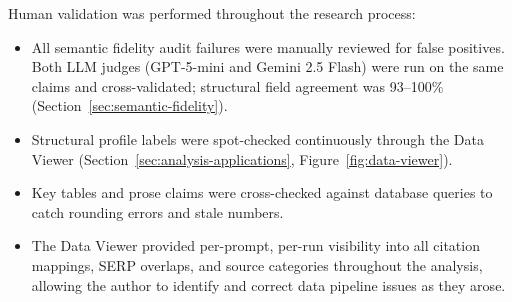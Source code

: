 Human validation was performed throughout the research process:
\begin{itemize}
    \item All semantic fidelity audit failures were manually reviewed for false positives. Both LLM judges (GPT-5-mini and Gemini 2.5 Flash) were run on the same claims and cross-validated; structural field agreement was 93--100\% (Section~\ref{sec:semantic-fidelity}).
    \item Structural profile labels were spot-checked continuously through the Data Viewer (Section~\ref{sec:analysis-applications}, Figure~\ref{fig:data-viewer}).
    \item Key tables and prose claims were cross-checked against database queries to catch rounding errors and stale numbers.
    \item The Data Viewer provided per-prompt, per-run visibility into all citation mappings, SERP overlaps, and source categories throughout the analysis, allowing the author to identify and correct data pipeline issues as they arose.
\end{itemize}
